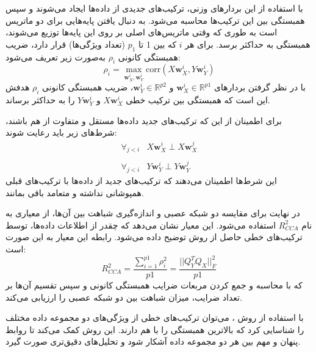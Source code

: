 با استفاده از این بردارهای وزنی، ترکیب‌های جدیدی از داده‌ها ایجاد می‌شوند و سپس همبستگی بین این ترکیب‌ها محاسبه می‌شود.
به دنبال یافتن پایه‌هایی برای دو ماتریس است به طوری که وقتی ماتریس‌های اصلی بر روی این پایه‌ها توزیع می‌شوند، همبستگی به حداکثر برسد. برای هر \(i\) که بین 1 تا \(p_1\) (تعداد ویژگی‌ها) قرار دارد، ضریب همبستگی کانونی \( \rho_i \) به‌صورت زیر تعریف می‌شود: 
\begin{equation}
	\rho_i = \max_{\mathbf{w}_X^i, \mathbf{w}_Y^i} \text{corr}(X \mathbf{w}_X^i, Y \mathbf{w}_Y^i)
\end{equation}
با در نظر گرفتن بردارهای \(\mathbf{w}_X^i \in \mathbb{R}^{p1}\) و \(\mathbf{w}_Y^i \in \mathbb{R}^{p2}\)، ضریب همبستگی کانونی \( \rho_i \) هدفش این است که همبستگی بین ترکیب خطی \( X \mathbf{w}_X^i \) و \( Y \mathbf{w}_Y^i \) را به حداکثر برساند.

برای اطمینان از این که ترکیب‌های جدید داده‌ها مستقل و متفاوت از هم باشند، شرط‌های زیر باید رعایت شوند:
\begin{equation}
	\begin{array}{ll}
		\forall_{j<i} & X \mathbf{w}_X^i \perp X \mathbf{w}_X^j
		\\
		\\
		\forall_{j<i} & Y \mathbf{w}_Y^i \perp Y \mathbf{w}_Y^j
	\end{array}
\end{equation}
این شرط‌ها اطمینان می‌دهند که ترکیب‌های جدید از داده‌ها با ترکیب‌های قبلی همپوشانی نداشته و متعامد باقی بمانند.

در نهایت برای مقایسه دو شبکه عصبی و اندازه‌گیری شباهت بین آن‌ها، از معیاری به نام \( R^2_{CCA} \) استفاده می‌شود. این معیار نشان می‌دهد که چقدر از اطلاعات داده‌ها، توسط ترکیب‌های خطی حاصل از روش
توضیح داده می‌شود. رابطه این معیار به این صورت است:
\begin{equation}
	R^2_{CCA} = \frac{\sum_{i=1}^{p1} \rho^2_i}{p1} = \frac{||Q^T_Y Q_X||^2_F}{p1}
	\label{eq_CCA}
\end{equation}
که با محاسبه و جمع کردن مربعات ضرایب همبستگی کانونی و سپس تقسیم آن‌ها بر تعداد ضرایب، میزان شباهت بین دو شبکه عصبی را ارزیابی می‌کند.

با استفاده از روش
%
، می‌توان ترکیب‌های خطی از ویژگی‌های دو مجموعه داده مختلف را شناسایی کرد که بالاترین همبستگی را با هم دارند. این روش کمک می‌کند تا روابط پنهان و مهم بین هر دو مجموعه داده آشکار شود و تحلیل‌های دقیق‌تری صورت گیرد.








